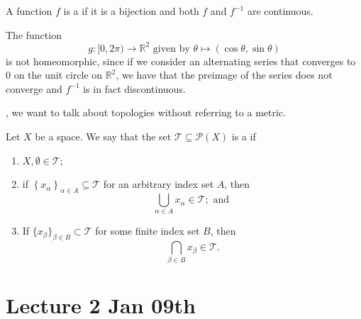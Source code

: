 \documentclass[notoc,notitlepage]{tufte-book}
\begin{document}
\begin{defn}[Homeomorphism]\label{defn:homeomorphism}
  A function $f$ is a  if it is a bijection and both $f$ and $f^{-1}$ are continuous.
\end{defn}

\begin{eg}
  The function
  \begin{equation*}
    g : [ 0, 2\pi ) \to \mathbb{R}^2 \text{ given by } \theta \mapsto (\cos \theta, \sin \theta)
  \end{equation*}
  is not homeomorphic, since if we consider an alternating series that converges to $0$ on the unit circle on $\mathbb{R}^2$, we have that the preimage of the series does not converge and $f^{-1}$ is in fact discontinuous.
\end{eg}

, we want to talk about topologies without referring to a metric.

\begin{defn}[Topology]\label{defn:topology}
  Let $X$ be a space. We say that the set $\mathcal{T} \subseteq \mathcal{P}(X)$ is a  if
  \begin{enumerate}
    \item $X, \emptyset \in \mathcal{T}$;
    \item if $\left\{ x_\alpha \right\}_{\alpha \in A} \subseteq \mathcal{T}$ for an arbitrary index set $A$, then
      \begin{equation*}
        \bigcup_{\alpha \in A} x_\alpha \in \mathcal{T}; \text{ and }
      \end{equation*}
    \item If $\{ x_\beta \}_{\beta \in B} \subset \mathcal{T}$ for some finite index set $B$, then
      \begin{equation*}
        \bigcap_{\beta \in B} x_\beta \in \mathcal{T}.
      \end{equation*}
  \end{enumerate}
\end{defn}



\chapter{Lecture 2 Jan 09th}%
\label{chp:lecture_2_jan_09th}
\end{document}
